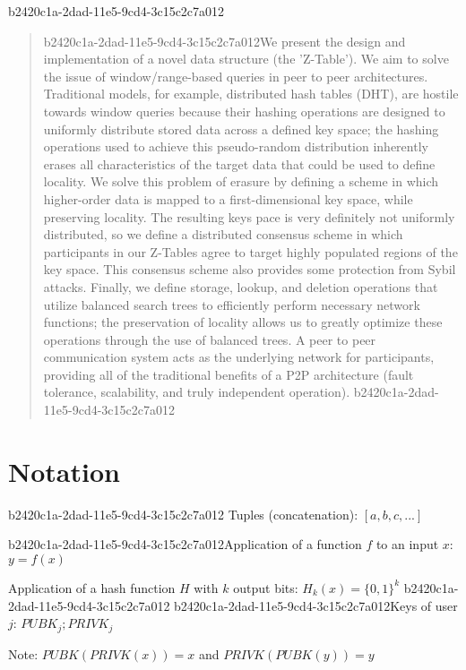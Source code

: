 \documentclass[12pt]{article}
\begin{document}
b2420c1a-2dad-11e5-9cd4-3c15c2c7a012
\maketitle

\begin{abstract}
b2420c1a-2dad-11e5-9cd4-3c15c2c7a012We present the design and implementation of a novel data structure (the 'Z-Table'). We aim to solve the issue of window/range-based queries in peer to peer architectures. Traditional models, for example,  distributed hash tables (DHT), are hostile towards window queries because their hashing operations are designed to uniformly distribute stored data across a defined key space; the hashing operations used to achieve this pseudo-random distribution inherently erases all characteristics of the target data that could be used to define locality. We solve this problem of erasure by defining a scheme in which higher-order data is mapped to a first-dimensional key space, while preserving locality. The resulting keys pace is very definitely not uniformly distributed, so we define a distributed consensus scheme in which participants in our Z-Tables agree to target highly populated regions of the key space. This consensus scheme also provides some protection from Sybil attacks. Finally, we define storage, lookup, and deletion operations that utilize balanced search trees to efficiently perform necessary network functions; the preservation of locality allows us to greatly optimize these operations through the use of balanced trees. A peer to peer communication system acts as the underlying network for participants, providing all of the traditional benefits of a P2P architecture (fault tolerance, scalability, and truly independent operation).
b2420c1a-2dad-11e5-9cd4-3c15c2c7a012\end{abstract}

\section{Notation}
b2420c1a-2dad-11e5-9cd4-3c15c2c7a012
Tuples (concatenation): $[a,b,c,...]$

b2420c1a-2dad-11e5-9cd4-3c15c2c7a012Application of a function $f$ to an input $x$: $y=f(x)$

Application of a hash function $H$ with $k$ output bits: $H_{k}(x) = \{0,1\}^k$
b2420c1a-2dad-11e5-9cd4-3c15c2c7a012
b2420c1a-2dad-11e5-9cd4-3c15c2c7a012Keys of user $j$: $ PUBK_j; PRIVK_j $

Note: $PUBK(PRIVK(x)) = x$ and $PRIVK(PUBK(y)) = y$~
\end{document}
